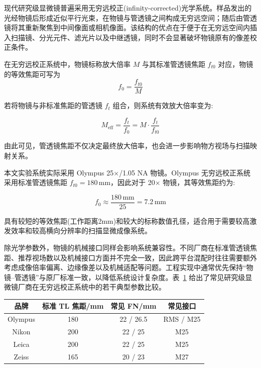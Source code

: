 现代研究级显微镜普遍采用无穷远校正(infinity-corrected)光学系统。样品发出的光经物镜后形成近似平行光束，在物镜与管透镜之间构成无穷远空间；随后由管透镜将其重新聚焦到中间像面或相机像面。该结构的优点在于便于在无穷远空间内插入扫描镜、分光元件、滤光片以及中继透镜，同时不会显著破坏物镜原有的像差校正条件。

在无穷远校正系统中，物镜标称放大倍率 $M$ 与其标准管透镜焦距 $f_{t0}$ 对应，物镜的等效焦距可写为
\begin{equation}
f_{0}=\frac{f_{t0}}{M}
\label{eq:f0_def}
\end{equation}

若将物镜与非标准焦距的管透镜 $f_t$ 组合，则系统有效放大倍率变为:

\begin{equation}
M_{\mathrm{eff}}=\frac{f_t}{f_0}=M\cdot\frac{f_t}{f_{t0}}
\label{eq:Meff_def}
\end{equation}

由此可见，管透镜焦距不仅决定最终放大倍率，也会进一步影响物方视场与扫描映射关系。

本文实验系统实际采用 Olympus 25$\times$/1.05 NA 物镜。Olympus 无穷远校正系统采用标准管透镜焦距 $f_{t0}=180\,\mathrm{mm}$，因此对于 20$\times$ 物镜，其等效焦距约为:

\begin{equation}
f_0 \approx \frac{180\,\mathrm{mm}}{25}=7.2\,\mathrm{mm}
\label{eq:f0_olympus20x}
\end{equation}

具有较短的等效焦距(工作距离2mm)和较大的标称数值孔径，适合用于需要较高激发效率和较高横向分辨率的扫描显微成像系统。

除光学参数外，物镜的机械接口同样会影响系统兼容性。不同厂商在标准管透镜焦距、推荐视场数以及机械接口方面并不完全一致，因此跨平台混配时往往需要额外考虑成像倍率偏离、边缘像差以及机械适配等问题。工程实现中通常优先保持``物镜--管透镜''与原厂标准一致，以降低系统设计复杂度。表~\ref{tab:objective_brand_compare} 给出了常见研究级显微镜厂商在无穷远校正系统中的若干典型参数比较。

\begin{table}[htbp]
\centering
{}
\label{tab:objective_brand_compare}
\setlength{\tabcolsep}{4pt}
\begin{tabular}{|c|c|c|c|}
\hline
品牌 & 标准 TL 焦距/mm & 常见 FN/mm & 常见接口 \\ \hline
Olympus & 180 & 22 / 26.5 & RMS / M25 \\ \hline
Nikon   & 200 & 22 / 25   & M25 \\ \hline
Leica   & 200 & 22 / 25   & M25 \\ \hline
Zeiss   & 165 & 20 / 23   & M27 \\ \hline
\end{tabular}
\end{table}




